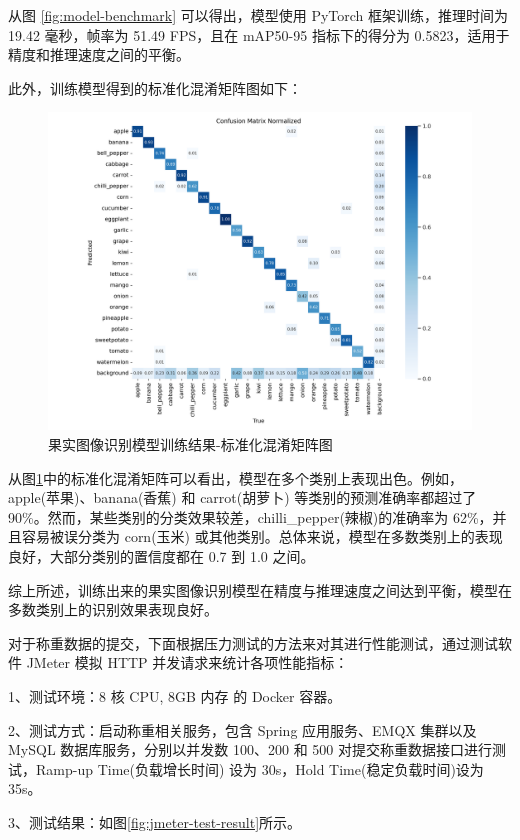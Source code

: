 从图 \ref{fig:model-benchmark} 可以得出，模型使用 PyTorch 框架训练，推理时间为 19.42 毫秒，帧率为 51.49 FPS，且在 mAP50-95 指标下的得分为 0.5823，适用于精度和推理速度之间的平衡。

此外，训练模型得到的标准化混淆矩阵图如下：

\begin{figure}
    \centering
    \includegraphics[width=0.9\linewidth]{../source/aws-img/yolov8/out/image/confusion_matrix_normalized.png}
    \caption{果实图像识别模型训练结果-标准化混淆矩阵图}
    \label{fig:confusion_matrix_normalized}
\end{figure}

从图\ref{fig:confusion_matrix_normalized}中的标准化混淆矩阵可以看出，模型在多个类别上表现出色。例如，apple(苹果)、banana(香蕉) 和 carrot(胡萝卜) 等类别的预测准确率都超过了 90\%。然而，某些类别的分类效果较差，chilli\_pepper(辣椒)的准确率为 62\%，并且容易被误分类为 corn(玉米) 或其他类别。总体来说，模型在多数类别上的表现良好，大部分类别的置信度都在 0.7 到 1.0 之间。

综上所述，训练出来的果实图像识别模型在精度与推理速度之间达到平衡，模型在多数类别上的识别效果表现良好。

对于称重数据的提交，下面根据压力测试的方法\cite{Zhu2017}来对其进行性能测试，通过测试软件 JMeter 模拟 HTTP 并发请求来统计各项性能指标：

1、测试环境：8 核 CPU, 8GB 内存 的 Docker 容器。

2、测试方式：启动称重相关服务，包含 Spring 应用服务、EMQX 集群以及MySQL 数据库服务，分别以并发数 100、200 和 500 对提交称重数据接口进行测试，Ramp-up Time(负载增长时间) 设为 30s，Hold Time(稳定负载时间)设为 35s。

3、测试结果：如图\ref{fig:jmeter-test-result}所示。

